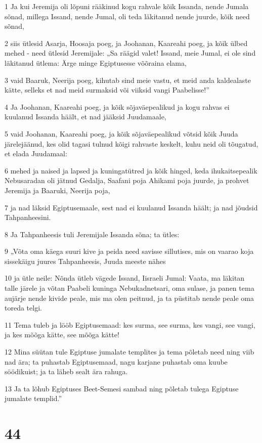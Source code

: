 \par 1 Ja kui Jeremija oli lõpuni rääkinud kogu rahvale kõik Issanda, nende Jumala sõnad, millega Issand, nende Jumal, oli teda läkitanud nende juurde, kõik need sõnad,
\par 2 siis ütlesid Asarja, Hoosaja poeg, ja Joohanan, Kaareahi poeg, ja kõik ülbed mehed - need ütlesid Jeremijale: „Sa räägid valet! Issand, meie Jumal, ei ole sind läkitanud ütlema: Ärge minge Egiptusesse võõraina elama,
\par 3 vaid Baaruk, Neerija poeg, kihutab sind meie vastu, et meid anda kaldealaste kätte, selleks et nad meid surmaksid või viiksid vangi Paabelisse!”
\par 4 Ja Joohanan, Kaareahi poeg, ja kõik sõjaväepealikud ja kogu rahvas ei kuulanud Issanda häält, et nad jääksid Juudamaale,
\par 5 vaid Joohanan, Kaareahi poeg, ja kõik sõjaväepealikud võtsid kõik Juuda järelejäänud, kes olid tagasi tulnud kõigi rahvaste keskelt, kuhu neid oli tõugatud, et elada Juudamaal:
\par 6 mehed ja naised ja lapsed ja kuningatütred ja kõik hinged, keda ihukaitsepealik Nebusaradan oli jätnud Gedalja, Saafani poja Ahikami poja juurde, ja prohvet Jeremija ja Baaruki, Neerija poja,
\par 7 ja nad läksid Egiptusemaale, sest nad ei kuulanud Issanda häält; ja nad jõudsid Tahpanheesini.
\par 8 Ja Tahpanheesis tuli Jeremijale Issanda sõna; ta ütles:
\par 9 „Võta oma käega suuri kive ja peida need savisse sillutises, mis on vaarao koja sissekäigu juures Tahpanheesis, Juuda meeste nähes
\par 10 ja ütle neile: Nõnda ütleb vägede Issand, Iisraeli Jumal: Vaata, ma läkitan talle järele ja võtan Paabeli kuninga Nebukadnetsari, oma sulase, ja panen tema aujärje nende kivide peale, mis ma olen peitnud, ja ta püstitab nende peale oma toreda telgi.
\par 11 Tema tuleb ja lööb Egiptusemaad: kes surma, see surma, kes vangi, see vangi, ja kes mõõga kätte, see mõõga kätte!
\par 12 Mina süütan tule Egiptuse jumalate templites ja tema põletab need ning viib nad ära; ta puhastab Egiptusemaad, nagu karjane puhastab oma kuube söödikuist; ja ta läheb sealt ära rahuga.
\par 13 Ja ta lõhub Egiptuses Beet-Semesi sambad ning põletab tulega Egiptuse jumalate templid.”

\chapter{44}


